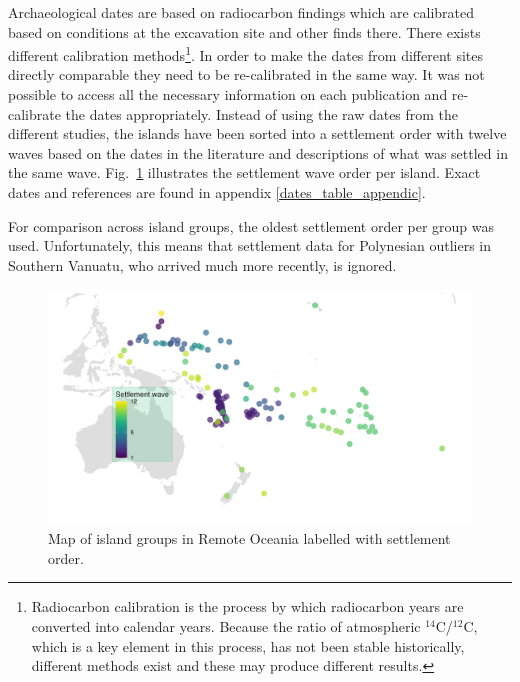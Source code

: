 \documentclass[a4paper,10pt]{article} %
\begin{document}
Archaeological dates are based on radiocarbon findings which are calibrated based on conditions at the excavation site and other finds there. There exists different calibration methods\footnote{Radiocarbon calibration is the process by which radiocarbon years are converted into calendar years. Because the ratio of atmospheric $^{14}$C/$^{12}$C, which is a key element in this process, has not been stable historically, different methods exist and these may produce different results.}. In order to make the dates from different sites directly comparable they need to be re-calibrated in the same way. It was not possible to access all the necessary information on each publication and re-calibrate the dates appropriately. Instead of using the raw dates from the different studies, the islands have been sorted into a settlement order with twelve waves based on the dates in the literature and descriptions of what was settled in the same wave. Fig.~\ref{dates_map} illustrates the settlement wave order per island. Exact dates and references are found in appendix \ref{dates_table_appendic}.

For comparison across island groups, the oldest settlement order per group was used. Unfortunately, this means that settlement data for Polynesian outliers in Southern Vanuatu, who arrived much more recently, is ignored.

\begin{figure}
\centering
\includegraphics[width=19cm]{Map_RO_dates.png}
\caption{{Map of island groups in Remote Oceania labelled with settlement order.}}
\label{dates_map}
\end{figure}
\end{document}
